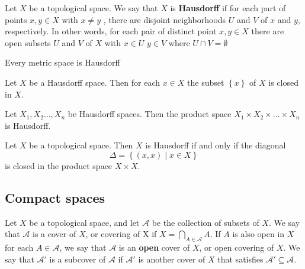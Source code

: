\documentclass{article}
\theoremstyle{remark}
\begin{document}
\begin{definition}[Hausdorff]

    Let $X $ be a topological space. We say that $X$ is \textbf{Hausdorff} if for each part of points $x,y  \in X $ with
    $x\neq y$ , there are disjoint neighborhoods $U$ and $V$ of $x$ and $y$, respectively. In other words, for each pair
    of distinct point $x,y \in  X$ there are open subsets $U$ and $V$ of $X$ with $x \in U$ $y \in V $ where $U \cap V =
    \emptyset $
\end{definition}

\begin{theorem}
    Every metric space is Hausdorff

\end{theorem}

\begin{theorem}
    Let $X$ be a Hausdorff space. Then for each $x \in X$ the subset $\left\{ x  \right\}$ of $X$ is closed in  $X$.
\end{theorem}

\begin{theorem}
    Let $X_{1}, X_{2} \ldots, X_{n} $ be Hausdorff spaces.  Then the product space $X_{1} \times  X_{2}\times  \ldots
    \times X_{n}  $ is Hausdorff.

\end{theorem}


\begin{theorem}
Let $X$ be a topological space.  Then $X$ is Hausdorff if and only if the diagonal \[
    \Delta = \left\{ \left( x,x \right)  \mid  x \in  X \right\}
\]is closed in the product space $X \times  X$.
\end{theorem}

\subsection{Compact spaces}%
\label{sub:compace_spaces}

\begin{definition}
    Let $X$ be a topological space, and let $\mathscr{A} $ be the collection of subsets of $X$. We say that  $
    \mathscr{A} $ is a cover of $X$, or covering of X if $X = \bigcap_{A \in \mathscr{A} }^{} A$. If $A$ is also open in
     $X$ for each  $A \in  \mathscr{A} $, we say that $\mathscr{A} $ is an \textbf{open} cover of $X$, or open
     covering of $X$. We say that $ \mathscr{A}' $ is a subcover of $\mathscr{A} $ if $\mathscr{A} '  $ is another
     cover of $X$ that satisfies  $ \mathscr{A '} \subseteq \mathscr{A}  $.
\end{definition}
\end{document}
